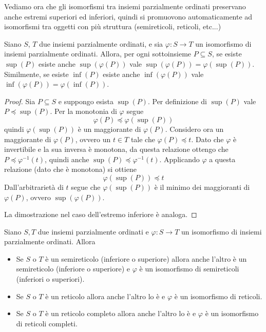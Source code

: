 \documentclass[12pt]{article}
\numberwithin{theorem}{subsection}
\begin{document}
Vediamo ora che gli isomorfismi tra insiemi parzialmente ordinati preservano anche estremi superiori ed inferiori, quindi si promuovono automaticamente ad isomorfismi tra oggetti con più struttura (semireticoli, reticoli, etc...)
\begin{prop}
	Siano $S$, $T$ due insiemi parzialmente ordinati, e sia $\varphi : S \rightarrow T$ un isomorfismo di insiemi parzialmente ordinati.
	Allora, per ogni sottoinsieme $P \subseteq S$, se esiste $\sup(P)$ esiste anche $\sup(\varphi(P))$ vale $\sup(\varphi(P)) = \varphi(\sup(P))$. Similmente, se esiste $\inf(P)$ esiste anche $\inf(\varphi(P))$ vale $\inf(\varphi(P)) = \varphi(\inf(P))$.
\end{prop}
\begin{proof}
	Sia $P \subseteq S$ e suppongo esista $\sup(P)$. Per definizione di $\sup(P)$ vale $P \preceq \sup(P)$. Per la monotonia di $\varphi$ segue
	\[
	\varphi(P) \preceq \varphi(\sup(P))
	\]
	quindi $\varphi(\sup(P))$ è un maggiorante di $\varphi(P)$.
	Considero ora un maggiorante di $\varphi(P)$, ovvero un $t \in T$ tale che $\varphi(P) \preceq t$. Dato che $\varphi$ è invertibile e la sua inversa è monotona, da questa relazione ottengo che $P \preceq \varphi^{-1}(t)$, quindi anche $\sup(P) \preceq \varphi^{-1}(t)$. Applicando $\varphi$ a questa relazione (dato che è monotona) si ottiene
	\[
	\varphi(\sup(P)) \preceq t
	\]
	Dall'arbitrarietà di $t$ segue che $\varphi(\sup(P))$ è il minimo dei maggioranti di $\varphi(P)$, ovvero $\sup(\varphi(P))$.
	
	La dimostrazione nel caso dell'estremo inferiore è analoga.
\end{proof}

\begin{corollary}
	Siano $S, T$ due insiemi parzialmente ordinati e $\varphi : S \rightarrow T$ un isomorfismo di insiemi parzialmente ordinati. Allora\begin{itemize}
		\item Se $S$ o $T$ è un semireticolo (inferiore o superiore) allora anche l'altro è un semireticolo (inferiore o superiore) e $\varphi$ è un isomorfismo di semireticoli (inferiori o superiori).
		\item Se $S$ o $T$ è un reticolo allora anche l'altro lo è e $\varphi$ è un isomorfismo di reticoli.
		\item Se $S$ o $T$ è un reticolo completo allora anche l'altro lo è e $\varphi$ è un isomorfismo di reticoli completi.
	\end{itemize}
\end{corollary}
\end{document}
